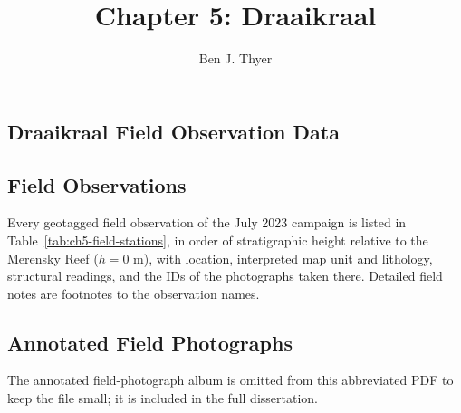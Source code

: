 \documentclass{caltech_thesis}
\title{Chapter 5: Draaikraal}\author{Ben J. Thyer}\copyyear{2026}
\begin{document}
\mainmatter
\setcounter{chapter}{4}

\begin{appendices}
\chapter{Draaikraal Field Observation Data}
\label{app:bushveld}
\label{app:draaikraal-field-data}
\section{Field Observations}
\label{sec:ch5-SI-field-data}
Every geotagged field observation of the July 2023 campaign is listed in
Table~\ref{tab:ch5-field-stations}, in order of stratigraphic height relative to
the Merensky Reef ($h = 0$ m), with location, interpreted map unit and lithology,
structural readings, and the IDs of the photographs taken there. Detailed field
notes are footnotes to the observation names.
\ChFiveFieldStationTable
\section{Annotated Field Photographs}
\label{sec:ch5-SI-photo-album}
The annotated field-photograph album is omitted from this abbreviated PDF to
keep the file small; it is included in the full dissertation.

\end{appendices}
\printbibliography[heading=bibintoc, title={References}]
\end{document}
